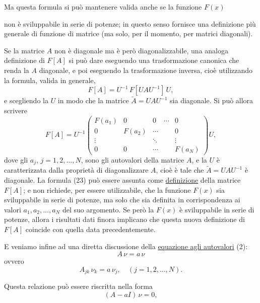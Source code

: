 \documentclass[11pt, a4paper]{book}
\numberwithin{equation}{section}
\begin{document}
Ma questa formula si può mantenere valida anche se la funzione $F(x)$


non è sviluppabile in serie di potenze; in questo senso fornisce una
definizione più generale di funzione di matrice (ma solo, per il momento,
per matrici diagonali).

Se la matrice $A$ non è diagonale ma è però diagonalizzabile, una analoga
definizione di $F[A]$ si può dare eseguendo una trasformazione canonica
che renda la $A$ diagonale, e poi eseguendo la trasformazione inversa,
cioè utilizzando la formula, valida in generale,
\begin{equation}
F[A] = U^{-1}\, F[UAU^{-1}]\, U,
\end{equation}
e scegliendo la $U$ in modo che la matrice $\widetilde{A} = UAU^{-1}$ sia
diagonale. Si può allora scrivere
\begin{equation}
F[A] = U^{-1}
\begin{pmatrix}
F(a_1) & 0      & 0      & \cdots & 0      \\
0      & F(a_2) & \cdots &        & 0      \\
\vdots &        & \ddots &        & \vdots \\
0      & 0      & \cdots &        & F(a_N)
\end{pmatrix}
U,
\end{equation}
dove gli $a_j$, $j = 1, 2, \ldots, N$, sono gli autovalori della matrice
$A$, e la $U$ è caratterizzata dalla proprietà di diagonalizzare $A$,
cioè è tale che $\widetilde{A} = UAU^{-1}$ è diagonale. La formula (23)
può essere assunta come \uline{definizione} della matrice $F[A]$; e
non richiede, per essere utilizzabile, che la funzione $F(x)$ sia
sviluppabile in serie di potenze, ma solo che sia definita in
corrispondenza ai valori $a_1, a_2, \ldots, a_N$ del suo argomento. Se
però la $F(x)$ è sviluppabile in serie di potenze, allora i risultati dati
finora implicano che questa nuova definizione di $F[A]$ coincide con
quella data precedentemente.

E veniamo infine ad una diretta discussione della \uline{equazione
agli autovalori} (2):
\[
A\,\nu = a\,\nu
\]
ovvero
\begin{equation}
A_{jk}\,\nu_k = a\,\nu_j, \quad (j = 1, 2, \ldots, N).
\end{equation}

Questa relazione può essere riscritta nella forma
\begin{equation}
(A - aI)\,\nu = 0, \tag{25a}
\end{equation}
\end{document}

